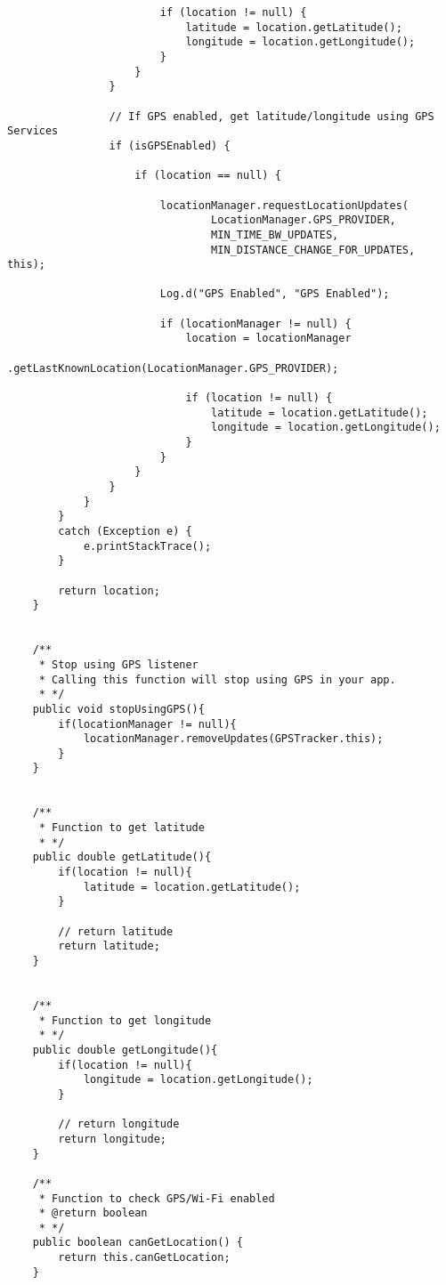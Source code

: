 \begin{lstlisting}
                        if (location != null) {
                            latitude = location.getLatitude();
                            longitude = location.getLongitude();
                        }
                    }
                }

                // If GPS enabled, get latitude/longitude using GPS Services
                if (isGPSEnabled) {

                    if (location == null) {

                        locationManager.requestLocationUpdates(
                                LocationManager.GPS_PROVIDER,
                                MIN_TIME_BW_UPDATES,
                                MIN_DISTANCE_CHANGE_FOR_UPDATES, this);

                        Log.d("GPS Enabled", "GPS Enabled");

                        if (locationManager != null) {
                            location = locationManager
                                    .getLastKnownLocation(LocationManager.GPS_PROVIDER);

                            if (location != null) {
                                latitude = location.getLatitude();
                                longitude = location.getLongitude();
                            }
                        }
                    }
                }
            }
        }
        catch (Exception e) {
            e.printStackTrace();
        }

        return location;
    }


    /**
     * Stop using GPS listener
     * Calling this function will stop using GPS in your app.
     * */
    public void stopUsingGPS(){
        if(locationManager != null){
            locationManager.removeUpdates(GPSTracker.this);
        }
    }


    /**
     * Function to get latitude
     * */
    public double getLatitude(){
        if(location != null){
            latitude = location.getLatitude();
        }

        // return latitude
        return latitude;
    }


    /**
     * Function to get longitude
     * */
    public double getLongitude(){
        if(location != null){
            longitude = location.getLongitude();
        }

        // return longitude
        return longitude;
    }

    /**
     * Function to check GPS/Wi-Fi enabled
     * @return boolean
     * */
    public boolean canGetLocation() {
        return this.canGetLocation;
    }



\end{lstlisting}
